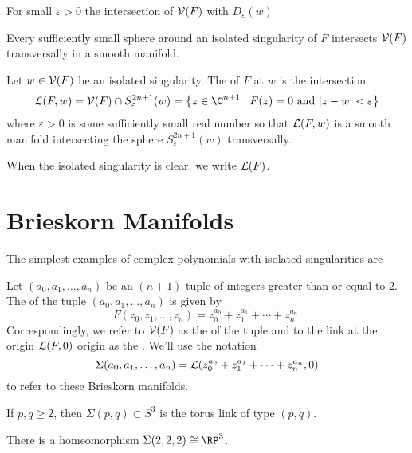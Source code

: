 \begin{theorem}
  For small $\varepsilon>0$ the intersection of $\mathcal{V}(F)$ with $D_\varepsilon(w)$
\end{theorem}

\begin{proposition}
	Every sufficiently small sphere around an isolated singularity of $F$ intersects $\mathcal{V}(F)$ transversally in a smooth manifold.
\end{proposition}

\begin{definition}
	Let $w\in \mathcal{V}(F)$ be an isolated singularity. The  of $F$ at $w$ is the intersection
	\[
		\L(F, w) = \V(F) \cap S^{2n+1}_\varepsilon(w) = \left\{ z\in \C^{n+1} \mid F(z)=0\textrm{ and } |z-w|<\varepsilon\right\}
	\]
	where $\varepsilon > 0$ is some sufficiently small real number so that $\mathcal{L}(F,w)$ is a smooth manifold intersecting the sphere $S^{2n+1}_\varepsilon(w)$ transversally.
\end{definition}

When the isolated singularity is clear, we write $\mathcal{L}(F)$.

\section{Brieskorn Manifolds}\label{sec:brieskorn-manifolds}
The simplest examples of complex polynomials with isolated singularities are 

\begin{definition}
	Let $(a_0,a_1,\ldots, a_n)$ be an $(n+1)$-tuple of integers greater than or equal to $2$. The  of the tuple $(a_0,a_1,\ldots, a_n)$ is given by
	\[
		F(z_0,z_1,\ldots, z_n) = z_0^{a_0} + z_1^{a_1} +\cdots + z_n^{a_n}.
	\]
	Correspondingly, we refer to $\mathcal{V}(F)$ as the  of the tuple and to the link at the origin $\mathcal{L}(F,0)$ origin as the . We'll use the notation
	\[
		\Sigma(a_0,a_1,\ldots, a_n) =\mathcal{L}(z_0^{a_0}+z_1^{a_1}+\cdots+z_n^{a_n}, 0)
	\]
	to refer to these Brieskorn manifolds.
\end{definition}


\begin{proposition}
	If $p,q\geq 2$, then $\Sigma(p,q)\subset S^3$ is the torus link of type $(p,q)$.
\end{proposition}

\begin{proposition}
	There is a homeomorphism $\Sigma(2,2,2)\cong \RP^3$.
\end{proposition}

